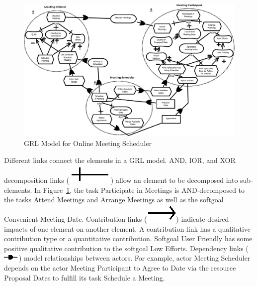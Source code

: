 \begin{figure}[ht]
\centering
\includegraphics[scale=0.35]{img/SchedulerModel}
\caption{GRL Model for Online Meeting Scheduler}
\label{fig:SchedulerModel}
\end{figure}

Different links connect the elements in a GRL model. AND, IOR, and XOR decomposition links (\includegraphics[scale=1]{img/decomposition}) allow an element to be decomposed into sub-elements. In Figure~\ref{fig:SchedulerModel}, the task \textsf{Participate in Meetings} is AND-decomposed to the tasks \textsf{Attend Meetings} and \textsf{Arrange Meetings} as well as the softgoal \textsf{Convenient Meeting Date}. Contribution links (\includegraphics[scale=1]{img/contribution}) indicate desired impacts of one element on another element. A contribution link has a qualitative contribution type or a quantitative contribution. Softgoal \textsf{User Friendly} has \textsf{some positive} qualitative contribution to the softgoal \textsf{Low Efforts}. Dependency links (\includegraphics[scale=1]{img/dependency}) model relationships between actors. For example, actor \textsf{Meeting Scheduler} depends on the actor \textsf{Meeting Participant} to \textsf{Agree to Date} via the resource \textsf{Proposal Dates} to fulfill its task \textsf{Schedule a Meeting}.

